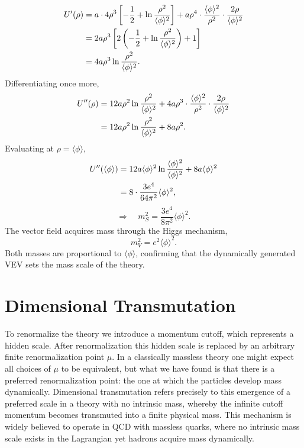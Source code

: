 \begin{align}
	U'(\rho) & = a\cdot 4\rho^3\left[-\frac{1}{2}
		                           + \ln\frac{\rho^2}{\langle\phi\rangle^2}\right]
	+ a\rho^4\cdot\frac{\langle\phi\rangle^2}{\rho^2}
	\cdot\frac{2\rho}{\langle\phi\rangle^2} \notag                                   \\
	         & = 2a\rho^3\left[2\left(-\frac{1}{2}
		                     + \ln\frac{\rho^2}{\langle\phi\rangle^2}\right) + 1\right]
	\notag                                                                           \\
	         & = 4a\rho^3\ln\frac{\rho^2}{\langle\phi\rangle^2}.
\end{align}
Differentiating once more,
\begin{align}
	U''(\rho) & = 12a\rho^2\ln\frac{\rho^2}{\langle\phi\rangle^2}
	+ 4a\rho^3\cdot\frac{\langle\phi\rangle^2}{\rho^2}
	\cdot\frac{2\rho}{\langle\phi\rangle^2} \notag                            \\
	          & = 12a\rho^2\ln\frac{\rho^2}{\langle\phi\rangle^2} + 8a\rho^2.
\end{align}
Evaluating at $\rho = \langle\phi\rangle$,
\begin{align}
	U''(\langle\phi\rangle)
	 & = 12a\langle\phi\rangle^2\ln\frac{\langle\phi\rangle^2}
	                               {\langle\phi\rangle^2} + 8a\langle\phi\rangle^2 \notag \\
	 & = 8\cdot\frac{3e^4}{64\pi^2}\langle\phi\rangle^2,
\end{align}
\begin{equation}
	\Rightarrow\quad\boxed{m_S^2 = \frac{3e^4}{8\pi^2}
		\langle\phi\rangle^2.}
\end{equation}
The vector field acquires mass through the Higgs mechanism,
\begin{equation}
	m_V^2 = e^2\langle\phi\rangle^2.
\end{equation}
Both masses are proportional to $\langle\phi\rangle$, confirming that
the dynamically generated VEV sets the mass scale of the theory.

\section{Dimensional Transmutation}

To renormalize the theory we introduce a momentum cutoff, which
represents a hidden scale. After renormalization this hidden scale is
replaced by an arbitrary finite renormalization point $\mu$. In a
classically massless theory one might expect all choices of $\mu$ to be
equivalent, but what we have found is that there is a preferred
renormalization point: the one at which the particles develop mass
dynamically. Dimensional transmutation refers precisely to this
emergence of a preferred scale in a theory with no intrinsic mass,
whereby the infinite cutoff momentum becomes transmuted into a finite
physical mass. This mechanism is widely believed to operate in QCD with
massless quarks, where no intrinsic mass scale exists in the Lagrangian
yet hadrons acquire mass dynamically.
